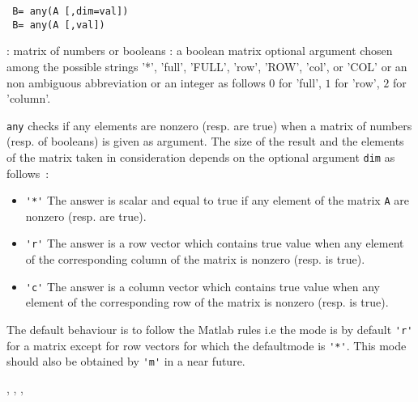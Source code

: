 \begin{mandesc}
\end{mandesc}
\begin{calling_sequence}
\begin{verbatim}
 B= any(A [,dim=val])
 B= any(A [,val])
\end{verbatim}
\end{calling_sequence}
\begin{parameters}
  \begin{varlist}
    :  matrix of numbers or booleans 
    : a boolean matrix 
     optional argument chosen among the possible strings '*', 
    'full', 'FULL', 'row', 'ROW', 'col', or 'COL'  or an non ambiguous abbreviation or an 
    integer as follows $0$ for 'full', $1$ for 'row', $2$ for 'column'.
  \end{varlist}
\end{parameters}

\begin{mandescription}
  \verb!any! checks if any elements are nonzero (resp. are true) when a matrix of numbers (resp. of booleans) 
  is given as argument. The size of the result and the elements of the matrix taken in consideration depends 
  on the optional argument \verb!dim! as follows~:
  \begin{itemize}
  \item \verb!'*'! The answer is scalar and equal to true if any element of the matrix \verb!A!
    are nonzero (resp. are true).
  \item \verb!'r'! The answer is a row vector which contains true value when any element of 
    the corresponding column of the matrix is nonzero (resp. is true). 
  \item \verb!'c'! The answer is a column vector which contains true value when any element of 
    the corresponding row of the matrix is nonzero (resp. is true).
  \end{itemize}
  The default behaviour is to follow the Matlab rules i.e the mode is by default \verb!'r'! 
  for a matrix except for row vectors for which the defaultmode is \verb!'*'!. 
  This mode should also be obtained by \verb!'m'! in a near future. 
\end{mandescription}
\begin{manseealso}
  , , , 
\end{manseealso}

